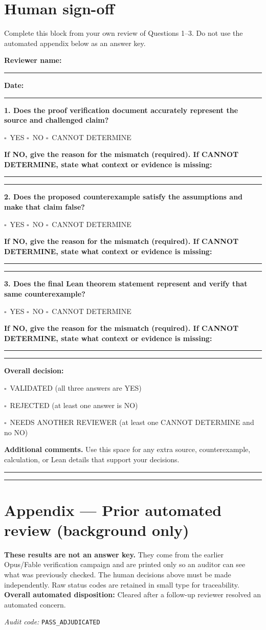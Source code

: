 \documentclass[11pt]{article}
\newcommand{\checkbox}{$\square$}
\newcommand{\answerchoices}{\checkbox\ YES \quad \checkbox\ NO \quad \checkbox\ CANNOT DETERMINE}
\newcommand{\decisionexplanation}{%
  \par\smallskip\textbf{If NO, give the reason for the mismatch (required). If
  CANNOT DETERMINE, state what context or evidence is missing:}\par
  \rule{\linewidth}{0.4pt}\par\vspace{7pt}\rule{\linewidth}{0.4pt}\par}
\begin{document}
\section*{Human sign-off}
Complete this block from your own review of Questions 1--3. Do not use the automated appendix below as an answer key.\par
\textbf{Reviewer name:} \rule{9cm}{0.4pt}\par
\textbf{Date:} \rule{4cm}{0.4pt}\par
\medskip\textbf{1. Does the proof verification document accurately represent the source and challenged claim?}\par
\answerchoices\par
\decisionexplanation
\medskip\textbf{2. Does the proposed counterexample satisfy the assumptions and make that claim false?}\par
\answerchoices\par
\decisionexplanation
\medskip\textbf{3. Does the final Lean theorem statement represent and verify that same counterexample?}\par
\answerchoices\par
\decisionexplanation
\medskip\textbf{Overall decision:}\par
\checkbox\ VALIDATED (all three answers are YES)\par
\checkbox\ REJECTED (at least one answer is NO)\par
\checkbox\ NEEDS ANOTHER REVIEWER (at least one CANNOT DETERMINE and no NO)\par
\medskip\textbf{Additional comments.} Use this space for any extra source, counterexample, calculation, or Lean details that support your decisions.\par\rule{\linewidth}{0.4pt}\par\vspace{7pt}\rule{\linewidth}{0.4pt}
\clearpage
\section*{Appendix --- Prior automated review (background only)}
\textbf{These results are not an answer key.} They come from the earlier Opus/Fable verification campaign and are printed only so an auditor can see what was previously checked. The human decisions above must be made independently. Raw status codes are retained in small type for traceability.
\textbf{Overall automated disposition:} Cleared after a follow-up reviewer resolved an automated concern.
\par\textit{Audit code:} \nolinkurl{PASS_ADJUDICATED}
\end{document}
